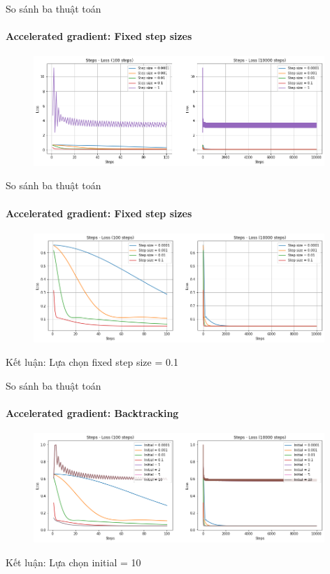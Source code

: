 \documentclass[10pt]{beamer}
\theoremstyle{remark}
\theoremstyle{definition}
\begin{document}
\begin{frame}{So sánh ba thuật toán}
	\framesubtitle{Accelerated gradient: Fixed step sizes}

	\begin{figure}[h!]
		\centering
		\includegraphics[width=11cm]{Thinh/16.png}
	\end{figure}

\end{frame}
\begin{frame}{So sánh ba thuật toán}
	\framesubtitle{Accelerated gradient: Fixed step sizes}

	\begin{figure}[h!]
		\centering
		\includegraphics[width=11cm]{Thinh/17.png}
	\end{figure}
	Kết luận: Lựa chọn fixed step size = 0.1

\end{frame}

\begin{frame}{So sánh ba thuật toán}
	\framesubtitle{Accelerated gradient: Backtracking}
	\begin{figure}[h!]
		\centering
		\includegraphics[width=11cm]{Thinh/18.png}
	\end{figure}
	Kết luận: Lựa chọn initial = 10
\end{frame}
\end{document}
